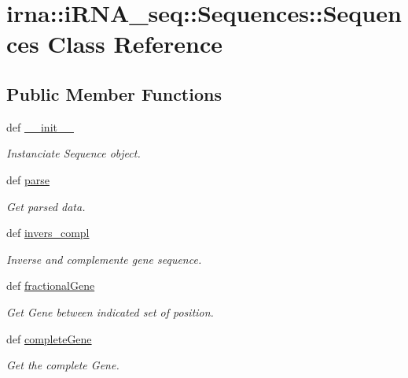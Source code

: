\hypertarget{classirna_1_1iRNA__seq_1_1Sequences_1_1Sequences}{
\section{irna\-:\-:i\-R\-N\-A\-\_\-seq\-:\-:\-Sequences\-:\-:\-Sequences \-Class \-Reference}
\label{classirna_1_1iRNA__seq_1_1Sequences_1_1Sequences}
}
\subsection*{\-Public \-Member \-Functions}
\begin{DoxyCompactItemize}
\item 
def \hyperlink{classirna_1_1iRNA__seq_1_1Sequences_1_1Sequences_ac9648d90252feb6f84c79e366e7c8dc4}{\-\_\-\-\_\-init\-\_\-\-\_\-}
\begin{DoxyCompactList}\small\item\em \-Instanciate \-Sequence object. \end{DoxyCompactList}\item 
def \hyperlink{classirna_1_1iRNA__seq_1_1Sequences_1_1Sequences_a87a53350eaebefe81a6c954577c97ea6}{parse}
\begin{DoxyCompactList}\small\item\em \-Get parsed data. \end{DoxyCompactList}\item 
def \hyperlink{classirna_1_1iRNA__seq_1_1Sequences_1_1Sequences_a5caddfd19d5fd6134d1733a5d8cdbee8}{invers\-\_\-compl}
\begin{DoxyCompactList}\small\item\em \-Inverse and complemente gene sequence. \end{DoxyCompactList}\item 
def \hyperlink{classirna_1_1iRNA__seq_1_1Sequences_1_1Sequences_a7cb1944a156729a2a1b35acb7a57f158}{fractional\-Gene}
\begin{DoxyCompactList}\small\item\em \-Get \-Gene between indicated set of position. \end{DoxyCompactList}\item 
def \hyperlink{classirna_1_1iRNA__seq_1_1Sequences_1_1Sequences_a3e2edb8019f9b4c4a01fca2010475f20}{complete\-Gene}
\begin{DoxyCompactList}\small\item\em \-Get the complete \-Gene. \end{DoxyCompactList}\item 

\end{DoxyCompactItemize}
